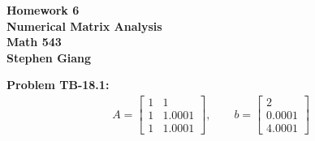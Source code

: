 \documentclass[12pt]{article}
\begin{document}
	
	\begin{center}
		\textbf{Homework 6} \\
		\textbf{Numerical Matrix Analysis} \\
		\textbf{Math 543} \\
		\textbf{Stephen Giang} \\
	\end{center}

\noindent \textbf{Problem TB-18.1: }
	\begin{align*}
		A = 
		\begin{bmatrix}
			1 & 1 \\
			1 & 1.0001 \\
			1 & 1.0001
		\end{bmatrix},
		\qquad 
		b = 
		\begin{bmatrix}
			2 \\
			0.0001 \\
			4.0001
		\end{bmatrix}
	\end{align*}
\end{document}

